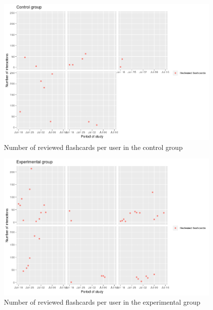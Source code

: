 \begin{figure}[htb]
    \vskip 5mm
        \begin{center}
            \includegraphics[scale=0.45]{./Figures/con_n_flashcards.png}
            \caption{Number of reviewed flashcards per user in the control group}
            \label{fig:cards-control}
        \end{center}
    \vskip -5mm
\end{figure}

\begin{figure}[htb]
    \vskip 5mm
        \begin{center}
            \includegraphics[scale=0.45]{./Figures/exp_n_flashcards.png}
            \caption{Number of reviewed flashcards per user in the experimental group}
            \label{fig:cards-experimental}
        \end{center}
    \vskip -5mm
\end{figure}

